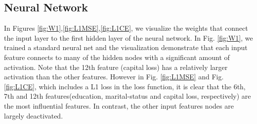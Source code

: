 \documentclass[conference]{IEEEtran}
\begin{document}
\subsection{Neural Network}
In Figures \ref{fig:W1},\ref{fig:L1MSE},\ref{fig:L1CE}, we visualize the weights that connect the input layer to the first hidden layer of the neural network. In Fig. \ref{fig:W1}, we trained a standard neural net and the visualization demonstrate that each input feature connects to many of the hidden nodes with a significant amount of activation. Note that the 12th feature (capital loss) has a relatively larger activation than the other features. However in Fig. \ref{fig:L1MSE} and Fig. \ref{fig:L1CE}, which includes a L1 loss in the loss function, it is clear that the 6th, 7th and 12th features(education, marital-status and capital loss, respectively) are the most influential features. In contrast, the other input features nodes are largely deactivated. \\
\end{document}
